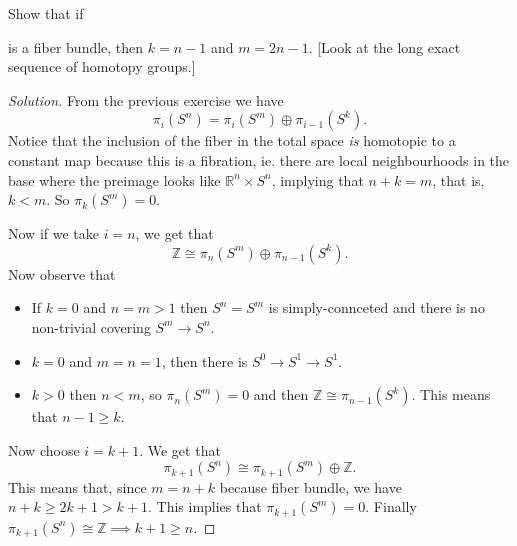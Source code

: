 \documentclass{article}
\numberwithin{equation}{section}
\newcommand{\R}{\mathbb{R}}
\newcommand{\Z}{\mathbb{Z}}
\begin{document}
\begin{exercise}[4.2.32]
	Show that if  is a fiber bundle, then $k=n-1$ and $m=2n-1$. [Look at the long exact sequence of homotopy groups.]
\end{exercise}
\begin{proof}[Solution]
	From the previous exercise we have
	\[
	\pi_i(S^n)=\pi_i(S^m)\oplus\pi_{i-1}(S^k)
	.\]
	Notice that the inclusion of the fiber in the total space \textit{is} homotopic to a constant map because this is a fibration, ie. there are local neighbourhoods in the base where the preimage looks like $\R^n\times S^n$, implying that $n+k=m$, that is, $k<m$. So $\pi_k(S^m)=0$.

	Now if we take $i=n$, we get that
	\[
	\Z\cong \pi_{n}(S^m)\oplus\pi_{n-1}(S^k)
	.\]
	Now observe that
	\begin{itemize}
		\item If $k=0$ and $n=m>1$ then $S^n=S^m$ is simply-connceted and there is no non-trivial covering $S^m\to S^n$.
		\item $k=0$  and $m=n=1$, then there is $S^0\to S^1\to S^1$.
		\item $k>0$ then $n<m$, so $\pi_{n}(S^m)=0$ and then $\Z\cong \pi_{n-1}(S^k)$. This means that $n-1\geq k$.
	\end{itemize}

	Now choose $i=k+1$. We get that
\[
\pi_{k+1}(S^n)\cong \pi_{k+1}(S^m)\oplus\Z
.\]
This means that, since $m=n+k$ because fiber bundle, we have $n+k\geq 2k+1>k+1$. This implies that $\pi_{k+1}(S^m)=0$. Finally $\pi_{k+1}(S^n)\cong \Z\implies k+1\geq n$.
\end{proof}
\end{document}
